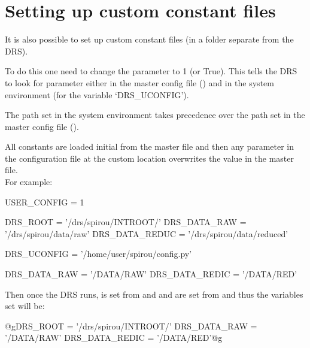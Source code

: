 \clearpage
\newpage
\section{Setting up custom constant files}
\label{ch:install:custom_constant_files}

It is also possible to set up custom constant files (in a folder separate from the DRS).

To do this one need to change the  parameter to 1 (or True). This tells the DRS to look for  parameter either in the master config file (\configtxtfile) and in the system environment (for the variable `DRS\_UCONFIG').

\begin{note}
The path set in the system environment takes precedence over the path set in the master config file (\configtxtfile).
\end{note}

\noindent All constants are loaded initial from the master file and then any parameter in the configuration file at the custom location overwrites the value in the master file. \\

\noindent For example:

\begin{textbox}[title={In ".../INTROOT/config/config.py"}]
USER_CONFIG = 1

DRS_ROOT = '/drs/spirou/INTROOT/'
DRS_DATA_RAW = '/drs/spirou/data/raw'
DRS_DATA_REDUC = '/drs/spirou/data/reduced'

DRS_UCONFIG = '/home/user/spirou/config.py'
\end{textbox}

\begin{textbox}[title={In "/home/user/spirou/config.py"}]
DRS_DATA_RAW = '/DATA/RAW'
DRS_DATA_REDIC = '/DATA/RED'
\end{textbox}

\vspace{0.5cm}

\noindent Then once the DRS runs,  is set from  and  and  are set from  and thus the variables set will be:
\begin{cmdboxprintspecial}
@gDRS_ROOT = '/drs/spirou/INTROOT/' 
DRS_DATA_RAW = '/DATA/RAW'
DRS_DATA_REDIC = '/DATA/RED'@g
\end{cmdboxprintspecial}

